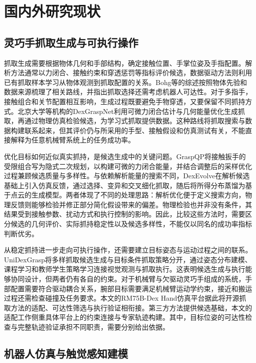 \section{国内外研究现状}
\label{sec:related_work}

\subsection{灵巧手抓取生成与可执行操作}
\label{subsec:grasp_generation_execution}

抓取生成需要根据物体几何和手部结构，确定接触位置、手掌位姿及手指配置。解析方法通常以力闭合、接触约束和穿透惩罚等指标评价候选，数据驱动方法则利用已有抓取样本学习从物体观测到抓取配置的关系。Bohg等的综述按照物体先验和数据来源梳理了相关路线，并指出抓取选择还需考虑机器人可达性\cite{bohg2014grasp}。对于多指手，接触组合和关节配置相互影响，生成过程既要避免手物穿透，又要保留不同抓持方式。北京大学等机构的DexGraspNet利用可微力闭合估计与几何能量优化生成抓取，再通过物理仿真检验候选，为学习式抓取提供数据\cite{wang2023dexgraspnet}。这种路线将抓取搜索与数据构建联系起来，但其评价仍与所采用的手型、接触假设和仿真测试有关，不能直接解释为任意机械臂系统上的任务成功率。

优化目标如何近似真实抓持，是候选生成中的关键问题。GraspQP将接触扳手的受限组合写为隐式二次规划，以构建可微的力闭合能量，并结合调整后的采样优化过程兼顾候选质量与多样性\cite{zurbrugg2025graspqp}。与依赖解析能量的搜索不同，DexEvolve在解析候选基础上引入仿真反馈，通过选择、变异和交叉细化抓取，随后将所得分布蒸馏为基于点云的生成模型\cite{zurbrugg2026dexevolve}。两者体现了不同的处理思路：解析优化便于定义搜索方向，物理反馈则能够检验并修正部分简化假设带来的偏差。物理检验也并非没有条件，其结果受到接触参数、扰动方式和执行控制的影响。因此，比较这些方法时，需要区分候选的几何评价、实际抓持稳定性以及候选多样性，不能仅以同名的成功率指标判断优劣。

从稳定抓持进一步走向可执行操作，还需要建立目标姿态与运动过程之间的联系。UniDexGrasp将多样抓取候选生成与目标条件抓取策略分开，通过姿态分布建模、课程学习和教师学生策略学习连接视觉观测与抓取执行\cite{xu2023unidexgrasp}。这表明候选生成与执行能够协同设计，但两者仍有各自的约束。对于机械臂与欠驱动灵巧手组成的系统，手部配置需要符合驱动耦合关系，腕部目标需要满足机械臂运动学约束，接近和搬运过程还需检查碰撞及任务要求。本文的RM75B-Dex Hand仿真平台据此将开源抓取方法的适配、可达性筛选与执行验证相衔接。第三方方法提供候选基础，本文的适配工作侧重具体平台上的约束连接与专家轨迹构建。其中，目标位姿的可达性检查与完整轨迹验证承担不同职责，需要分别给出依据。

\subsection{机器人仿真与触觉感知建模}
\label{subsec:simulation_tactile_modeling}

